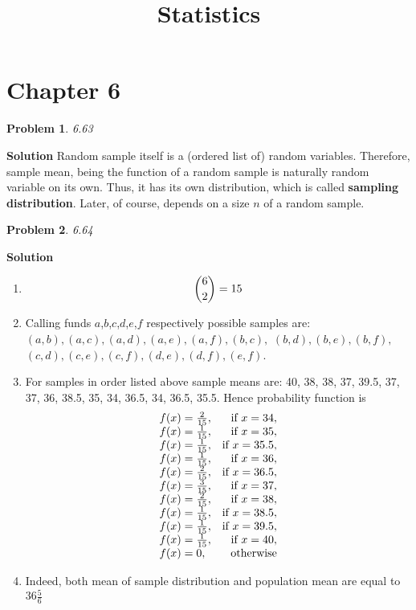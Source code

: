 \documentclass[8pt]{article} %
\title{Statistics}
\date{}
\newtheorem{prob}{Problem}
\newenvironment{solution}%
{\par\textbf{Solution}\space }%
{\par}
\begin{document}
\maketitle
\section{Chapter 6}
\begin{prob}6.63\end{prob}
\begin{solution}
	Random sample itself is a (ordered list of) random variables. Therefore, sample mean, being the function of a random sample is naturally
	random variable on its own. Thus, it has its own distribution, which is called \textbf{sampling distribution}. Later, of course, depends
	on a size $n$ of a random sample.
\end{solution}
\begin{prob}6.64\end{prob}
\begin{solution}
\begin{enumerate}[label=\alph*.]
	\item{\[\dbinom{6}{2}=15\]}
	\item{Calling funds $a$,$b$,$c$,$d$,$e$,$f$ respectively possible samples are: $(a,b),(a,c),(a,d),(a,e),(a,f),(b,c),$
		$(b,d),(b,e),(b,f),$
		$(c,d),(c,e),(c,f),(d,e),(d,f),(e,f)$.
		}
	\item{For samples in order listed above sample means are: 40, 38, 38, 37, 39.5,
		37, 37, 36, 38.5, 35, 34, 36.5, 34, 36.5, 35.5. Hence probability function is
		\[\begin{array}{l r}
			f(x)=\frac{2}{15}, & \mbox{if } x=34,\\
			f(x)=\frac{1}{15}, & \mbox{if } x=35,\\
			f(x)=\frac{1}{15}, & \mbox{if } x=35.5,\\
			f(x)=\frac{1}{15}, & \mbox{if } x=36,\\
			f(x)=\frac{2}{15}, & \mbox{if } x=36.5,\\
			f(x)=\frac{3}{15}, & \mbox{if } x=37,\\
			f(x)=\frac{2}{15}, & \mbox{if } x=38,\\
			f(x)=\frac{1}{15}, & \mbox{if } x=38.5,\\
			f(x)=\frac{1}{15}, & \mbox{if } x=39.5,\\
			f(x)=\frac{1}{15}, & \mbox{if } x=40,\\
			f(x)=0, & \mbox{otherwise}
		\end{array}\]
		}
	\item{Indeed, both mean of sample distribution and population mean are equal to $36\frac{5}{6}$
		}
\end{enumerate}
\end{solution}
\end{document}
